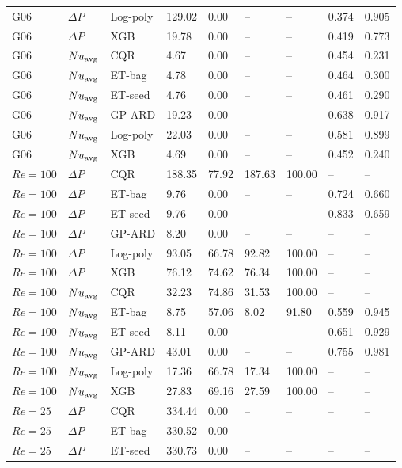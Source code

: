 \begin{longtable}{lllllllll}
G06 & $\Delta P$ & Log-poly & 129.02 & 0.00 & -- & -- & 0.374 & 0.905\\
G06 & $\Delta P$ & XGB & 19.78 & 0.00 & -- & -- & 0.419 & 0.773\\
G06 & $Nu_{\rm avg}$ & CQR & 4.67 & 0.00 & -- & -- & 0.454 & 0.231\\
G06 & $Nu_{\rm avg}$ & ET-bag & 4.78 & 0.00 & -- & -- & 0.464 & 0.300\\
G06 & $Nu_{\rm avg}$ & ET-seed & 4.76 & 0.00 & -- & -- & 0.461 & 0.290\\
G06 & $Nu_{\rm avg}$ & GP-ARD & 19.23 & 0.00 & -- & -- & 0.638 & 0.917\\
G06 & $Nu_{\rm avg}$ & Log-poly & 22.03 & 0.00 & -- & -- & 0.581 & 0.899\\
G06 & $Nu_{\rm avg}$ & XGB & 4.69 & 0.00 & -- & -- & 0.452 & 0.240\\
$Re=100$ & $\Delta P$ & CQR & 188.35 & 77.92 & 187.63 & 100.00 & -- & --\\
$Re=100$ & $\Delta P$ & ET-bag & 9.76 & 0.00 & -- & -- & 0.724 & 0.660\\
$Re=100$ & $\Delta P$ & ET-seed & 9.76 & 0.00 & -- & -- & 0.833 & 0.659\\
$Re=100$ & $\Delta P$ & GP-ARD & 8.20 & 0.00 & -- & -- & -- & --\\
$Re=100$ & $\Delta P$ & Log-poly & 93.05 & 66.78 & 92.82 & 100.00 & -- & --\\
$Re=100$ & $\Delta P$ & XGB & 76.12 & 74.62 & 76.34 & 100.00 & -- & --\\
$Re=100$ & $Nu_{\rm avg}$ & CQR & 32.23 & 74.86 & 31.53 & 100.00 & -- & --\\
$Re=100$ & $Nu_{\rm avg}$ & ET-bag & 8.75 & 57.06 & 8.02 & 91.80 & 0.559 & 0.945\\
$Re=100$ & $Nu_{\rm avg}$ & ET-seed & 8.11 & 0.00 & -- & -- & 0.651 & 0.929\\
$Re=100$ & $Nu_{\rm avg}$ & GP-ARD & 43.01 & 0.00 & -- & -- & 0.755 & 0.981\\
$Re=100$ & $Nu_{\rm avg}$ & Log-poly & 17.36 & 66.78 & 17.34 & 100.00 & -- & --\\
$Re=100$ & $Nu_{\rm avg}$ & XGB & 27.83 & 69.16 & 27.59 & 100.00 & -- & --\\
$Re=25$ & $\Delta P$ & CQR & 334.44 & 0.00 & -- & -- & -- & --\\
$Re=25$ & $\Delta P$ & ET-bag & 330.52 & 0.00 & -- & -- & -- & --\\
$Re=25$ & $\Delta P$ & ET-seed & 330.73 & 0.00 & -- & -- & -- & --\\

\end{longtable}
